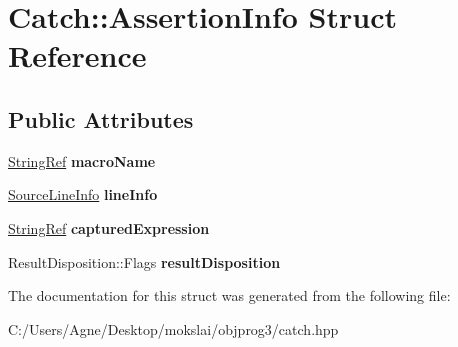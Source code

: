 \hypertarget{struct_catch_1_1_assertion_info}{}\section{Catch\+:\+:Assertion\+Info Struct Reference}
\label{struct_catch_1_1_assertion_info}
\subsection*{Public Attributes}
\begin{DoxyCompactItemize}
\item 
\mbox{\label{struct_catch_1_1_assertion_info_aaf3fbb9f1fe09c879ba3d877584e3056}} 
\mbox{\hyperlink{class_catch_1_1_string_ref}{String\+Ref}} {\bfseries macro\+Name}
\item 
\mbox{\label{struct_catch_1_1_assertion_info_a17bdbb404ba12658034f833be2f4c3e7}} 
\mbox{\hyperlink{struct_catch_1_1_source_line_info}{Source\+Line\+Info}} {\bfseries line\+Info}
\item 
\mbox{\label{struct_catch_1_1_assertion_info_accd36744b4acaa3a691a72df0b42190f}} 
\mbox{\hyperlink{class_catch_1_1_string_ref}{String\+Ref}} {\bfseries captured\+Expression}
\item 
\mbox{\label{struct_catch_1_1_assertion_info_a60353b3632ab2f827162f2b2d6911073}} 
Result\+Disposition\+::\+Flags {\bfseries result\+Disposition}
\end{DoxyCompactItemize}


The documentation for this struct was generated from the following file\+:\begin{DoxyCompactItemize}
\item 
C\+:/\+Users/\+Agne/\+Desktop/mokslai/objprog3/catch.\+hpp\end{DoxyCompactItemize}
